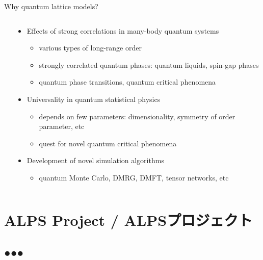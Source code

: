 \begin{frame}[t,fragile]{Why quantum lattice models?}
\begin{columns}[T]
\begin{column}{.2\textwidth}
    \end{column}
    \begin{column}{.8\textwidth}
      \begin{itemize}
      \item Effects of strong correlations in many-body quantum systems
        \begin{itemize}
        \item various types of long-range order
        \item strongly correlated quantum phases: quantum liquids, spin-gap phases
        \item quantum phase transitions, quantum critical phenomena
        \end{itemize}
      \item Universality in quantum statistical physics
        \begin{itemize}
        \item depends on few parameters: dimensionality, symmetry of order parameter, etc
        \item quest for novel quantum critical phenomena
        \end{itemize}
      \item Development of novel simulation algorithms
        \begin{itemize}
        \item quantum Monte Carlo, DMRG, DMFT, tensor networks, etc
        \end{itemize}
      \end{itemize}
    \end{column}
  \end{columns}
\end{frame}

\section{ALPS Project / ALPSプロジェクト}
\subsection*{{\protect\color{red}●}{\protect\color{blue}●}{\protect\color{green}●}}

